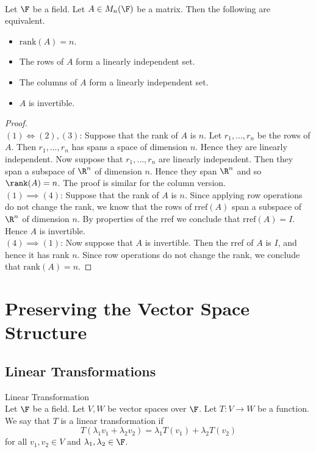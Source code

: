 \documentclass[a4paper]{article}
\begin{document}
\begin{prp}{}{}\\
Let $\F$ be a field. Let $A\in M_n(\F)$ be a matrix. Then the following are equivalent. 
\begin{itemize}
\item $\text{rank}(A)=n$. 
\item The rows of $A$ form a linearly independent set. 
\item The columns of $A$ form a linearly independent set. 
\item $A$ is invertible. 
\end{itemize}
\begin{proof}\\
$(1)\iff(2),(3)$: Suppose that the rank of $A$ is $n$. Let $r_1,\dots,r_n$ be the rows of $A$. Then $r_1,\dots,r_n$ has spans a space of dimension $n$. Hence they are linearly independent. Now suppose that $r_1,\dots,r_n$ are linearly independent. Then they span a subspace of $\R^n$ of dimension $n$. Hence they span $\R^n$ and so $\rank(A)=n$. The proof is similar for the column version. \\

$(1)\implies(4)$: Suppose that the rank of $A$ is $n$. Since applying row operations do not change the rank, we know that the rows of $\text{rref}(A)$ span a subspace of $\R^n$ of dimension $n$. By properties of the rref we conclude that $\text{rref}(A)=I$. Hence $A$ is invertible. \\

$(4)\implies(1)$: Now suppose that $A$ is invertible. Then the rref of $A$ is $I$, and hence it has rank $n$. Since row operations do not change the rank, we conclude that $\text{rank}(A)=n$. 
\end{proof}
\end{prp}

\pagebreak
\section{Preserving the Vector Space Structure}
\subsection{Linear Transformations}
\begin{defn}{Linear Transformation}{}\\
Let $\F$ be a field. Let $V,W$ be vector spaces over $\F$. Let $T:V\to W$ be a function. We say that $T$ is a linear transformation if $$T(\lambda_1v_1+\lambda_2v_2)=\lambda_1T(v_1)+\lambda_2T(v_2)$$ for all $v_1,v_2\in V$ and $\lambda_1,\lambda_2\in\F$. 
\end{defn}
\end{document}
